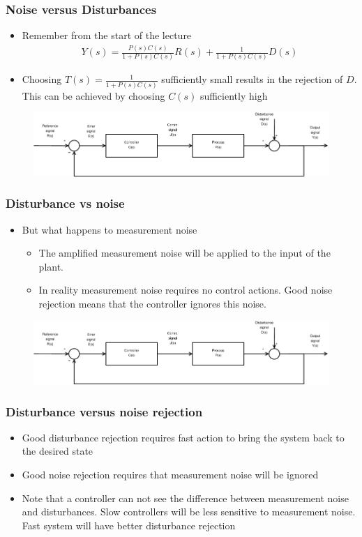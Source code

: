 \begin{frame}
	\frametitle{Noise versus Disturbances}
	\begin{itemize}
		\item Remember from the start of the lecture
		\begin{align*}
			Y(s) = \frac{P(s)C(s)}{1+P(s)C(s)}R(s) + \frac{1}{1+P(s)C(s)}D(s)
		\end{align*}
		\item Choosing $T(s)=\frac{1}{1+P(s)C(s)}$ sufficiently small results in the rejection of $D$. This can be achieved by choosing $C(s)$ sufficiently high
	\end{itemize}
	\begin{figure}
\centering
\includegraphics[width=0.7\linewidth]{Closed-Loop}
\label{fig:Closed-Loop4}
\end{figure}
\end{frame}


\begin{frame}
	\frametitle{Disturbance vs noise}
	\begin{itemize}
		\item But what happens to measurement noise
		\begin{itemize}
			\item The amplified measurement noise will be applied to the input of the plant.
			\item In reality measurement noise requires no control actions. Good noise rejection means that the controller ignores this noise.
		\end{itemize}
	\end{itemize}
	\begin{figure}
\centering
\includegraphics[width=0.7\linewidth]{Closed-Loop}
\label{fig:Closed-Loop5}
\end{figure}
\end{frame}


\begin{frame}
	\frametitle{Disturbance versus noise rejection}
	\begin{itemize}
		\item Good disturbance rejection requires fast action to bring the system back to the desired state
		\item Good noise rejection requires that measurement noise will be ignored
		\item Note that a controller can not see the difference between measurement noise and disturbances. Slow controllers will be less sensitive to measurement noise. Fast system will have better disturbance rejection
	\end{itemize}
\end{frame}

